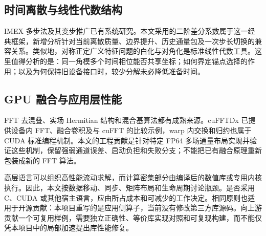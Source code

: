 \subsection{时间离散与线性代数结构}

IMEX 多步法及其变步推广已有系统研究\cite{r9,r12}。本文采用的二阶差分系数属于这一经典框架，新增分析针对当前离散质量、边界提升、历史通量包及一次步长切换的兼容关系。类似地，对称正定广义特征问题的白化与对角化是标准线性代数工具\cite{r10}。这里值得分析的是：同一角模多个时间相位能否共享坐标；如何界定锚点选择的作用；以及为何保持旧设备接口时，较少分解未必降低准备时间。

\subsection{GPU 融合与应用层性能}

FFT 去混叠、实场 Hermitian 结构和混合基算法都有成熟来源\cite{r11,r13}。cuFFTDx 已提供设备内 FFT、融合卷积及与 cuFFT 的比较示例\cite{r17}，warp 内交换和归约也属于 CUDA 标准编程机制\cite{r18}。本文的工程贡献是针对特定 FP64 多场通量布局实现并验证这些机制，保留强弱通道误差、启动负担和失败分支；不能把已有融合原理重新包装成新的 FFT 算法。

高层语言可以组织高性能流动求解，而计算密集部分由编译后的数值库或专用内核执行\cite{r14}。因此，本文按数据移动、同步、矩阵布局和生命周期讨论瓶颈。是否采用 C、CUDA 或其他宿主语言，应由所占成本和可减少的工作决定。相同原则也适用于开源贡献：本项目重写的是应用侧算子，当前没有修改第三方库源码。向上游贡献一个可复用样例，需要独立正确性、等价库实现对照和可复现构建，而不能仅凭本项目中的局部加速提出库性能修复。

